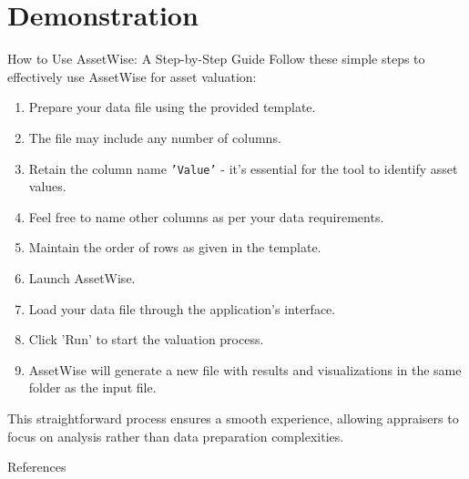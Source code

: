 \documentclass{beamer}
\begin{document}
\section{Demonstration}
\begin{frame}[allowframebreaks]{How to Use AssetWise: A Step-by-Step Guide}
	Follow these simple steps to effectively use AssetWise for asset valuation:
	\begin{enumerate}
		\item Prepare your data file using the provided template.
		\item The file may include any number of columns.
		\item Retain the column name \texttt{'Value'} - it's essential for the tool to identify asset values.
		\item Feel free to name other columns as per your data requirements.
		\item Maintain the order of rows as given in the template.
		\item Launch AssetWise.
		\item Load your data file through the application's interface.
		\item Click 'Run' to start the valuation process.
		\item AssetWise will generate a new file with results and visualizations in the same folder as the input file.
	\end{enumerate}
	This straightforward process ensures a smooth experience, allowing appraisers to focus on analysis rather than data preparation complexities.
\end{frame}


\begin{frame}[allowframebreaks]{References}
	\printbibliography
\end{frame}
\end{document}
